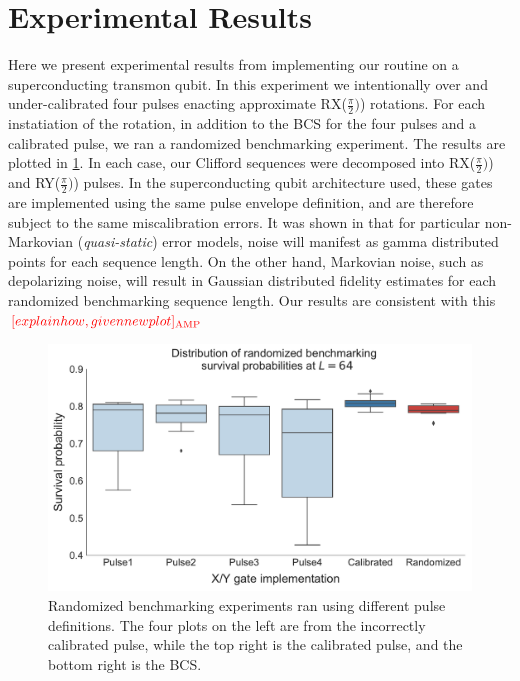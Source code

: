 \documentclass[aps,nofootinbib,pra,notitlepage,twocolumn]{revtex4-1}
\newcommand{\amp}[1]{{\color{red}[#1]_{\rm{AMP}}}}
\begin{document}
\section{Experimental Results}\label{experimental}
Here we present experimental results from implementing our routine on a superconducting transmon qubit. In this experiment we intentionally over and under-calibrated four pulses enacting approximate RX($\frac{\pi}{2})$) rotations. For each instatiation of the rotation, in addition to the BCS for the four pulses and a calibrated pulse, we ran a randomized benchmarking experiment.\cite{Magesan2011} The results are plotted in \ref{fig:rb}. In each case, our Clifford sequences were decomposed into RX($\frac{\pi}{2})$) and RY($\frac{\pi}{2})$) pulses. In the superconducting qubit architecture used, these gates are implemented using the same pulse envelope definition, and are therefore subject to the same miscalibration errors. It was shown in \cite{Ball2016} that for particular non-Markovian (\textit{quasi-static}) error models, noise will manifest as gamma distributed points for each sequence length. On the other hand, Markovian noise, such as depolarizing noise, will result in Gaussian distributed fidelity estimates for each randomized benchmarking sequence length. Our results are consistent with this $\amp{explain how, given new plot}$

\begin{figure}[H]
  \centering
  \includegraphics[width=\columnwidth]{rb_data.pdf}
  \caption{Randomized benchmarking experiments ran using different pulse definitions. The four plots on the left are from the incorrectly calibrated pulse, while the top right is the calibrated pulse, and the bottom right is the BCS.}
  \label{fig:rb}
\end{figure}
\end{document}
